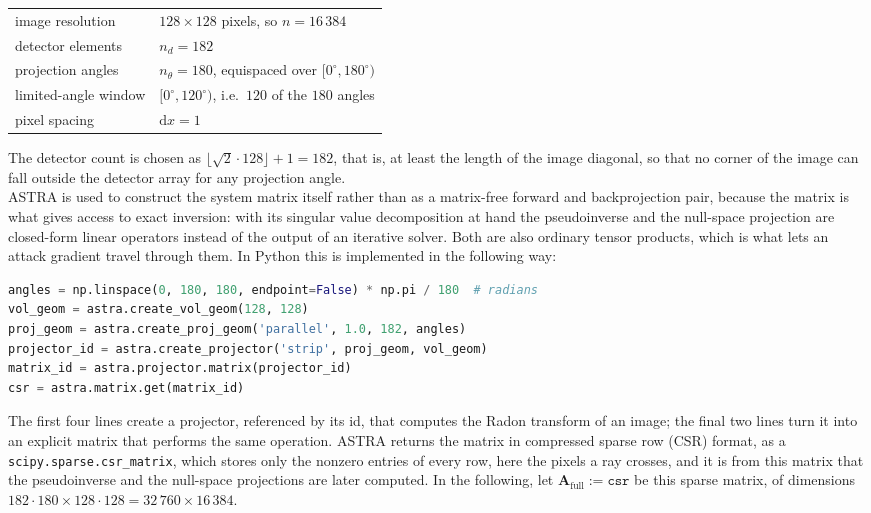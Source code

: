 \documentclass{article}
\numberwithin{equation}{section}
\begin{document}
\begin{center}
\begin{tabular}{ll}
\toprule
image resolution        & $128\times128$ pixels, so $n=16\,384$ \\
detector elements       & $n_d=182$ \\
projection angles       & $n_\theta=180$, equispaced over $\lbrack 0^\circ,180^\circ\rparen$ \\
limited-angle window    & $\lbrack 0^\circ,120^\circ\rparen$, i.e.\ $120$ of the $180$ angles \\
pixel spacing           & $\mathrm{d}x=1$ \\
\bottomrule
\end{tabular}
\end{center}

\noindent
The detector count is chosen as $\lfloor\sqrt2\cdot128\rfloor+1=182$, that is, at
least the length of the image diagonal, so that no corner of the image can fall
outside the detector array for any projection angle.\\
ASTRA is used to construct the system matrix itself rather than as a
matrix-free forward and backprojection pair, because the matrix is what gives
access to exact inversion: with its singular value decomposition at hand the
pseudoinverse and the null-space projection are closed-form linear operators
instead of the output of an iterative solver. Both are also ordinary tensor
products, which is what lets an attack gradient travel through them. In Python
this is implemented in the following way:
\begin{lstlisting}[language=Python]
angles = np.linspace(0, 180, 180, endpoint=False) * np.pi / 180  # radians
vol_geom = astra.create_vol_geom(128, 128)
proj_geom = astra.create_proj_geom('parallel', 1.0, 182, angles)
projector_id = astra.create_projector('strip', proj_geom, vol_geom)
matrix_id = astra.projector.matrix(projector_id)
csr = astra.matrix.get(matrix_id)
\end{lstlisting}
The first four lines create a projector, referenced by its id, that computes the Radon transform of an image;
the final two lines turn it into an explicit matrix that performs the same operation.
ASTRA returns the matrix in compressed sparse row (CSR) format, as a
\texttt{scipy.sparse.csr\_matrix}, which stores only the nonzero entries of every row, here the
pixels a ray crosses, and it is from this matrix that the pseudoinverse and the null-space projections
are later computed.
In the following, let $\mathbf{A}_\text{full}:=\texttt{csr}$ be this sparse matrix, of dimensions $182\cdot180\times128\cdot128=32\,760\times16\,384$.
\end{document}
